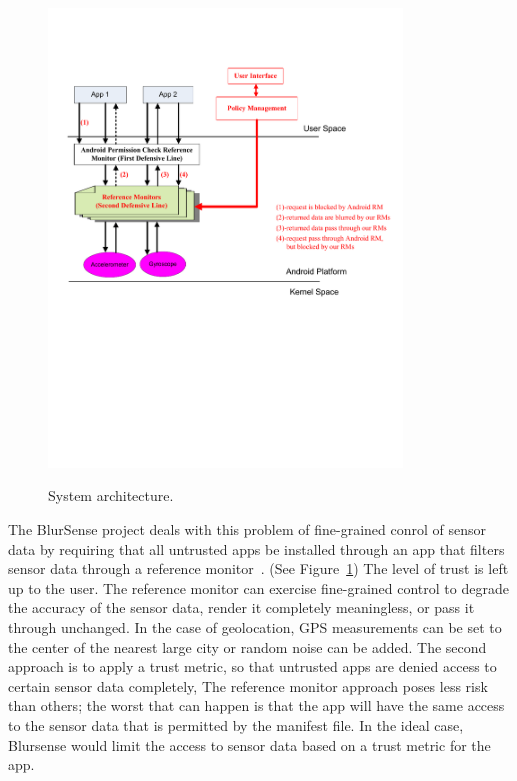 \begin{figure}%
  \centering
  \includegraphics[width=3.7in]{refMonDesign.pdf}\\
  \caption{System architecture.}
  \label{Fig:design}
\end{figure}

The BlurSense project deals with this problem of fine-grained conrol of sensor data
by requiring that all untrusted apps be installed
through an app that filters sensor data through a reference monitor~\cite{cappos2014blursense}.  
(See Figure~\ref{Fig:design})
The level of trust is left up to the user.  The reference
monitor can exercise fine-grained control to degrade the accuracy of the sensor data, render it 
completely meaningless, or pass it through unchanged.  
In the case of geolocation, GPS measurements can be set to the center of the nearest
large city or random noise can be added.  
The second approach is to apply a trust metric, so that untrusted apps are denied access to certain
sensor data completely,
The reference monitor approach poses less risk than others; the worst that can happen is
that the app will have the same access to the sensor data that
is permitted by the manifest file. In the ideal case, Blursense
would limit the access to sensor data based on a trust metric for the app.

